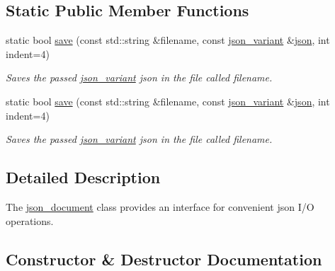 \subsection*{Static Public Member Functions}
\begin{DoxyCompactItemize}
\item 
static bool \hyperlink{classJSONLIB__NAMESPACE_1_1json__document_af8f392a0ffc779277ead1f2bdb222930}{save} (const std\+::string \&filename, const \hyperlink{classJSONLIB__NAMESPACE_1_1json__variant}{json\+\_\+variant} \&\hyperlink{classJSONLIB__NAMESPACE_1_1json__document_ad87b8e7d68ba854dbd730758273a3b93}{json}, int indent=4)
\begin{DoxyCompactList}\small\item\em Saves the passed \hyperlink{classJSONLIB__NAMESPACE_1_1json__variant}{json\+\_\+variant} {\ttfamily json} in the file called {\ttfamily filename}. \end{DoxyCompactList}\item 
static bool \hyperlink{classJSONLIB__NAMESPACE_1_1json__document_a3742c9b58495c2803cef4495bf49a191}{save} (const std\+::string \&filename, const \hyperlink{classJSONLIB__NAMESPACE_1_1json__variant}{json\+\_\+variant} \&\hyperlink{classJSONLIB__NAMESPACE_1_1json__document_ad87b8e7d68ba854dbd730758273a3b93}{json}, int indent=4)
\begin{DoxyCompactList}\small\item\em Saves the passed \hyperlink{classJSONLIB__NAMESPACE_1_1json__variant}{json\+\_\+variant} {\ttfamily json} in the file called {\ttfamily filename}. \end{DoxyCompactList}\end{DoxyCompactItemize}


\subsection{Detailed Description}
The \hyperlink{classJSONLIB__NAMESPACE_1_1json__document}{json\+\_\+document} class provides an interface for convenient json I/O operations. 

\subsection{Constructor \& Destructor Documentation}
\mbox{\label{classJSONLIB__NAMESPACE_1_1json__document_abf4e22f3453ec9856f58a202dae0c836}} 
